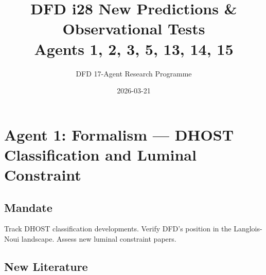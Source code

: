 \documentclass[11pt,a4paper]{article}
\title{DFD i28 New Predictions \& Observational Tests\\Agents 1, 2, 3, 5, 13, 14, 15}
\author{DFD 17-Agent Research Programme}
\date{2026-03-21}
\begin{document}
\maketitle
\tableofcontents
\newpage

\section{Agent 1: Formalism --- DHOST Classification and Luminal Constraint}

\subsection{Mandate}
Track DHOST classification developments. Verify DFD's position in the Langlois-Noui landscape. Assess new luminal constraint papers.

\subsection{New Literature}
\end{document}
